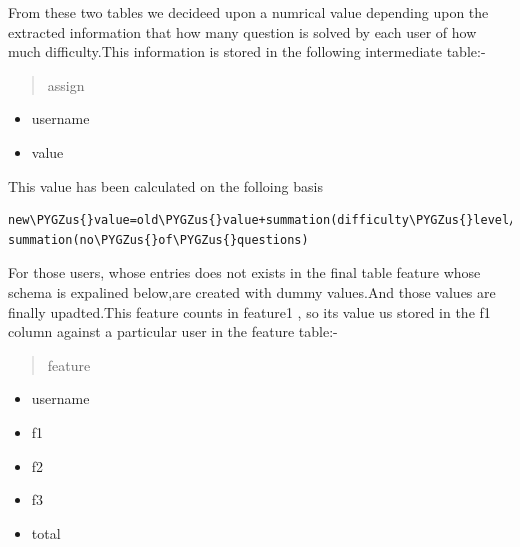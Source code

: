 \documentclass[a4paper,12pt,oneside]{sphinxmanual}
\def\PYGZus{\char`\_}
\begin{document}
From these two tables we decideed upon a numrical value depending upon the extracted information that how many question is solved by each user of how much difficulty.This information is stored in the following intermediate table:-
\begin{quote}\begin{description}
\item[{assign}] \leavevmode
\end{description}\end{quote}
\begin{itemize}
\item {} 
username

\item {} 
value

\end{itemize}

This value has been calculated on the folloing basis

\begin{Verbatim}[commandchars=\\\{\}]
new\PYGZus{}value=old\PYGZus{}value+summation(difficulty\PYGZus{}level/attempts)/
summation(no\PYGZus{}of\PYGZus{}questions)
\end{Verbatim}

For those users, whose entries does not exists in the final table feature whose schema is expalined below,are created with dummy values.And those values are finally upadted.This feature counts in feature1 , so its value us stored in the f1 column against a particular user in the feature table:-
\begin{quote}\begin{description}
\item[{feature}] \leavevmode
\end{description}\end{quote}
\begin{itemize}
\item {} 
username

\item {} 
f1

\item {} 
f2

\item {} 
f3

\item {} 
total

\end{itemize}
\end{document}
